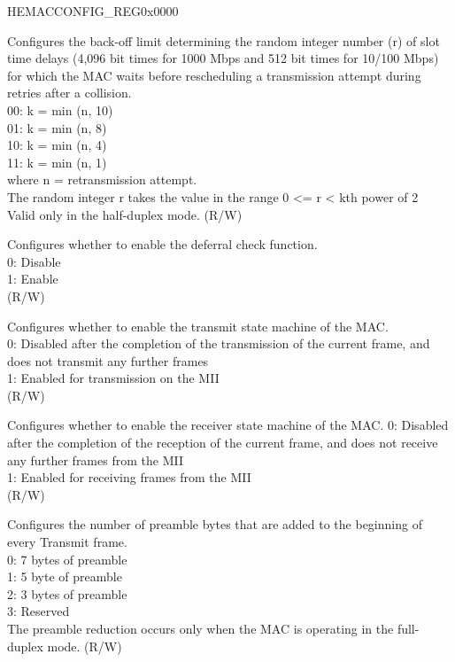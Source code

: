 \addtocounter{Regfloat}{-1}
\begin{register}{H}{EMACCONFIG\_REG}{0x0000}
\begin{regdesc}\begin{reglist}
\item[Continued from the previous page...]

\item [EMACBACKOFFLIMIT]
Configures the back-off limit determining the random integer number (r) of slot time delays (4,096 bit times for 1000 Mbps and 512 bit times for 10/100 Mbps) for which the MAC waits before rescheduling a transmission attempt during retries after a collision.\\
00: k = min (n, 10)\\
01: k = min (n, 8)\\
10: k = min (n, 4)\\
11: k = min (n, 1)\\
where n = retransmission attempt.\\
The random integer r takes the value in the
range 0 <= r < kth power of 2\\
Valid only in the half-duplex mode. (R/W)
\item [EMACDEFERRALCHECK] Configures whether to enable the deferral check function.\\
0: Disable\\
1: Enable\\(R/W)
\item [EMACTX] Configures whether to enable the transmit state machine of the MAC.\\
0: Disabled after the completion of the transmission of the current frame, and does not transmit any further frames\\
1: Enabled for transmission on the MII\\ (R/W)
\item [EMACRX] Configures whether to enable the receiver state machine of the MAC.
0: Disabled after the completion of the reception of the current frame, and does not receive any further frames from the MII\\
1: Enabled for receiving frames from the MII\\ (R/W)
\item [PLTF] Configures the number of preamble bytes that are added to the beginning of every Transmit frame.\\
0: 7 bytes of preamble\\
1: 5 byte of preamble\\
2: 3 bytes of preamble\\
3: Reserved\\
The preamble reduction occurs only when the MAC is operating in the full-duplex mode. (R/W)
\end{reglist}\end{regdesc}
\end{register}

